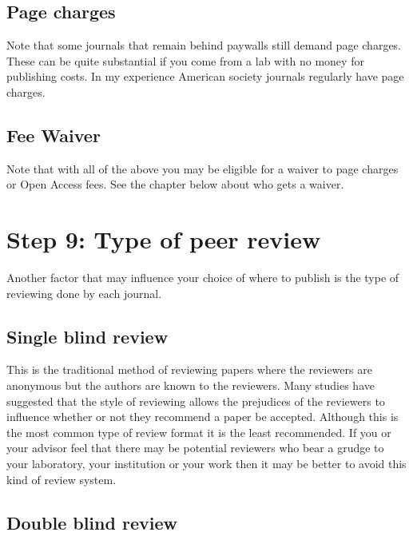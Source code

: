 \documentclass[
]{krantz}
\begin{document}
\hypertarget{page-charges}{%
\subsection{Page charges}\label{page-charges}}

Note that some journals that remain behind paywalls still demand page charges. These can be quite substantial if you come from a lab with no money for publishing costs. In my experience American society journals regularly have page charges.

\hypertarget{fee-waiver}{%
\subsection{Fee Waiver}\label{fee-waiver}}

Note that with all of the above you may be eligible for a waiver to page charges or Open Access fees. See the chapter below about who gets a waiver.

\hypertarget{step-9-type-of-peer-review}{%
\section{Step 9: Type of peer review}\label{step-9-type-of-peer-review}}

Another factor that may influence your choice of where to publish is the type of reviewing done by each journal.

\hypertarget{single-blind-review}{%
\subsection{Single blind review}\label{single-blind-review}}

This is the traditional method of reviewing papers where the reviewers are anonymous but the authors are known to the reviewers. Many studies have suggested that the style of reviewing allows the prejudices of the reviewers to influence whether or not they recommend a paper be accepted. Although this is the most common type of review format it is the least recommended. If you or your advisor feel that there may be potential reviewers who bear a grudge to your laboratory, your institution or your work then it may be better to avoid this kind of review system.

\hypertarget{double-blind-review}{%
\subsection{Double blind review}\label{double-blind-review}}
\end{document}
